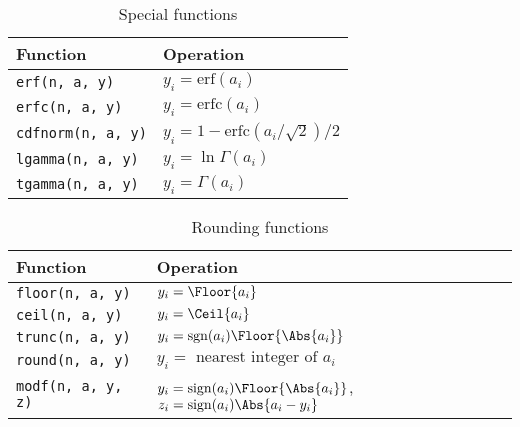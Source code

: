 \begin{table}
  \begin{tabularx}{\textwidth}{LL}
    \toprule
    Function & Operation \\
    \midrule
    \verb|erf(n, a, y)|     & $y_i = \mathrm{erf}(a_i)$                     \\
    \verb|erfc(n, a, y)|    & $y_i = \mathrm{erfc}(a_i)$                    \\
    \verb|cdfnorm(n, a, y)| & $y_i = 1 - \mathrm{erfc}(a_i / \sqrt{2}) / 2$ \\
    \verb|lgamma(n, a, y)|  & $y_i = \ln\Gamma(a_i)$                        \\
    \verb|tgamma(n, a, y)|  & $y_i = \Gamma(a_i)$                           \\
    \bottomrule
  \end{tabularx}
  \caption{Special functions}
  \label{tab:Special functions}
\end{table}

\begin{table}
  \begin{tabularx}{\textwidth}{LL}
    \toprule
    Function & Operation \\
    \midrule
    \verb|floor(n, a, y)| & $y_i = \Floor{a_i}$                        \\ 
    \verb|ceil(n, a, y)|  & $y_i = \Ceil{a_i}$                         \\ 
    \verb|trunc(n, a, y)| & $y_i = \mathrm{sgn}(a_i)\Floor{\Abs{a_i}}$ \\ 
    \verb|round(n, a, y)| & $y_i = \text{ nearest integer of }a_i$     \\ 
    \verb|modf(n, a, y, z)| &
    $y_i = \mathrm{sign}(a_i)\Floor{\Abs{a_i}}$,
    $z_i = \mathrm{sign}(a_i)\Abs{a_i - y_i}$ \\
    \bottomrule
  \end{tabularx}
  \caption{Rounding functions}
  \label{tab:Rounding functions}
\end{table}

\clearpage

